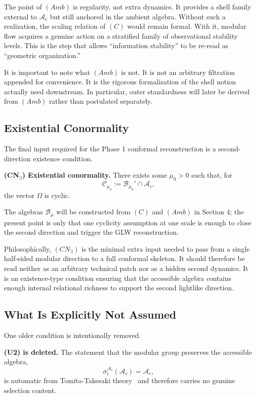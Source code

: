 \documentclass[12pt]{article}
\theoremstyle{definition}
\theoremstyle{remark}
\begin{document}
The point of \((Amb)\) is regularity, not extra dynamics. It provides a
shell family external to \(\mathcal{A}_c\) but still anchored in the
ambient algebra. Without such a realization, the scaling relation of
\((C)\) would remain formal. With it, modular flow acquires a genuine
action on a stratified family of observational stability levels. This is
the step that allows ``information stability'' to be re-read as
``geometric organization.''

It is important to note what \((Amb)\) is not. It is not an arbitrary
filtration appended for convenience. It is the rigorous formalization of
the shell notion actually used downstream. In particular, outer
standardness will later be derived from \((Amb)\) rather than postulated
separately.

\subsection{Existential Conormality}\label{existential-conormality}

The final input required for the Phase 1 conformal reconstruction is a
second-direction existence condition.

\textbf{(CN\(_\exists\)) Existential conormality.}
There exists some \(\mu_0>0\) such that, for \[
\mathcal{C}_{\mu_0}:=\mathcal{B}_{\mu_0}'\cap \mathcal{A}_c,
\] the vector \(\Omega\) is cyclic.

The algebras \(\mathcal{B}_{\mu}\) will be constructed from \((C)\) and
\((Amb)\) in Section 4; the present point is only that one cyclicity
assumption at one scale is enough to close the second direction and
trigger the GLW reconstruction.

Philosophically, \((CN_\exists)\) is the minimal extra input needed to
pass from a single half-sided modular direction to a full conformal
skeleton. It should therefore be read neither as an arbitrary technical
patch nor as a hidden second dynamics. It is an existence-type condition
ensuring that the accessible algebra contains enough internal relational
richness to support the second lightlike direction.

\subsection{What Is Explicitly Not
Assumed}\label{what-is-explicitly-not-assumed}

One older condition is intentionally removed.

\textbf{(U2) is deleted.}
The statement that the modular group preserves the accessible algebra,
\[
\sigma_t^{\mathcal{A}_c}(\mathcal{A}_c)=\mathcal{A}_c,
\] is automatic from Tomita-Takesaki theory~\cite{Takesaki2003} and therefore carries no
genuine selection content.
\end{document}

